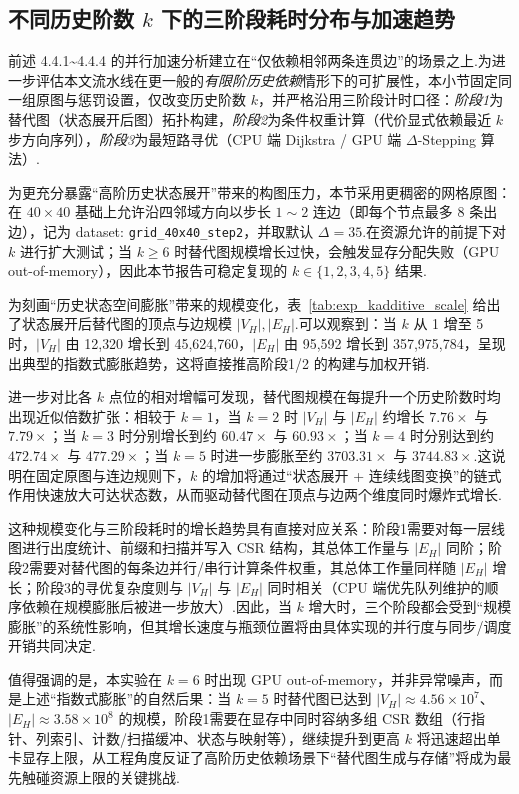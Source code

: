 \subsection{不同历史阶数 $k$ 下的三阶段耗时分布与加速趋势}

前述 4.4.1\textasciitilde 4.4.4 的并行加速分析建立在“仅依赖相邻两条连贯边”的场景之上.为进一步评估本文流水线在更一般的\emph{有限阶历史依赖}情形下的可扩展性，本小节固定同一组原图与惩罚设置，仅改变历史阶数 $k$，并严格沿用三阶段计时口径：\emph{阶段1}为替代图（状态展开后图）拓扑构建，\emph{阶段2}为条件权重计算（代价显式依赖最近 $k$ 步方向序列），\emph{阶段3}为最短路寻优（CPU 端 Dijkstra / GPU 端 $\Delta$-Stepping 算法）.

为更充分暴露“高阶历史状态展开”带来的构图压力，本节采用更稠密的网格原图：在 $40\times 40$ 基础上允许沿四邻域方向以步长 $1\sim 2$ 连边（即每个节点最多 8 条出边），记为 dataset: \texttt{grid\_40x40\_step2}，并取默认 $\Delta=35$.在资源允许的前提下对 $k$ 进行扩大测试；当 $k\ge 6$ 时替代图规模增长过快，会触发显存分配失败（GPU out-of-memory），因此本节报告可稳定复现的 $k\in\{1,2,3,4,5\}$ 结果.

为刻画“历史状态空间膨胀”带来的规模变化，表~\ref{tab:exp_kadditive_scale} 给出了状态展开后替代图的顶点与边规模 $|V_H|,|E_H|$.可以观察到：当 $k$ 从 1 增至 5 时，$|V_H|$ 由 12{,}320 增长到 45{,}624{,}760，$|E_H|$ 由 95{,}592 增长到 357{,}975{,}784，呈现出典型的指数式膨胀趋势，这将直接推高阶段1/2 的构建与加权开销.

进一步对比各 $k$ 点位的相对增幅可发现，替代图规模在每提升一个历史阶数时均出现近似倍数扩张：相较于 $k=1$，当 $k=2$ 时 $|V_H|$ 与 $|E_H|$ 约增长 $7.76\times$ 与 $7.79\times$；当 $k=3$ 时分别增长到约 $60.47\times$ 与 $60.93\times$；当 $k=4$ 时分别达到约 $472.74\times$ 与 $477.29\times$；当 $k=5$ 时进一步膨胀至约 $3703.31\times$ 与 $3744.83\times$.这说明在固定原图与连边规则下，$k$ 的增加将通过“状态展开 + 连续线图变换”的链式作用快速放大可达状态数，从而驱动替代图在顶点与边两个维度同时爆炸式增长.

这种规模变化与三阶段耗时的增长趋势具有直接对应关系：阶段1需要对每一层线图进行出度统计、前缀和扫描并写入 CSR 结构，其总体工作量与 $|E_H|$ 同阶；阶段2需要对替代图的每条边并行/串行计算条件权重，其总体工作量同样随 $|E_H|$ 增长；阶段3的寻优复杂度则与 $|V_H|$ 与 $|E_H|$ 同时相关（CPU 端优先队列维护的顺序依赖在规模膨胀后被进一步放大）.因此，当 $k$ 增大时，三个阶段都会受到“规模膨胀”的系统性影响，但其增长速度与瓶颈位置将由具体实现的并行度与同步/调度开销共同决定.

值得强调的是，本实验在 $k=6$ 时出现 GPU out-of-memory，并非异常噪声，而是上述“指数式膨胀”的自然后果：当 $k=5$ 时替代图已达到 $|V_H|\approx 4.56\times 10^7$、$|E_H|\approx 3.58\times 10^8$ 的规模，阶段1需要在显存中同时容纳多组 CSR 数组（行指针、列索引、计数/扫描缓冲、状态与映射等），继续提升到更高 $k$ 将迅速超出单卡显存上限，从工程角度反证了高阶历史依赖场景下“替代图生成与存储”将成为最先触碰资源上限的关键挑战.

